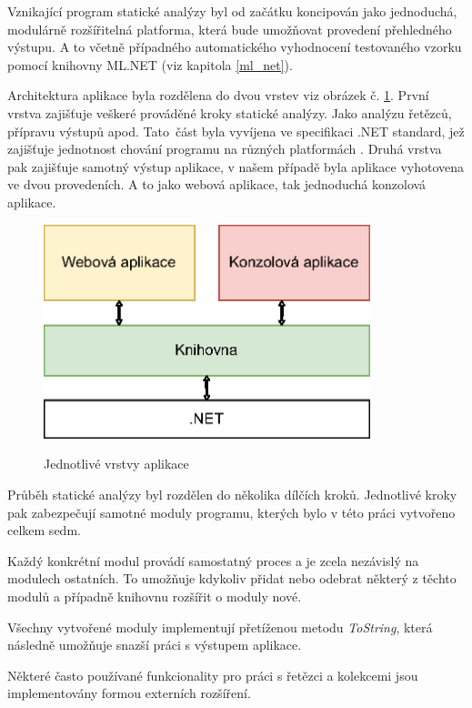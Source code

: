 Vznikající program statické analýzy byl od začátku koncipován jako jednoduchá, modulárně rozšířitelná platforma, která bude umožňovat provedení přehledného výstupu. A to včetně případného automatického vyhodnocení testovaného vzorku pomocí knihovny ML.NET (viz kapitola \ref{ml_net}).

Architektura aplikace byla rozdělena do dvou vrstev viz obrázek č. \ref{fig:appLayers}. První vrstva zajišťuje veškeré prováděné kroky statické analýzy. Jako analýzu řetězců, přípravu výstupů apod. Tato~část byla vyvíjena ve specifikaci .NET standard, jež zajišťuje jednotnost chování programu na různých platformách \cite{dotnet_standard}. \label{dotnet_standard}
Druhá vrstva pak zajišťuje samotný výstup aplikace, v našem případě byla aplikace vyhotovena ve dvou provedeních. A to jako webová aplikace, tak jednoduchá konzolová aplikace. 

\begin{figure}[H]
    \caption{Jednotlivé vrstvy aplikace}
    \centering
    \includegraphics[width=95mm,scale=0.5]{Figures/obrazky/Programlayers.eps}
    \label{fig:appLayers}
\end{figure}


Průběh statické analýzy byl rozdělen do několika dílčích kroků. Jednotlivé kroky pak zabezpečují samotné moduly programu, kterých bylo v této práci vytvořeno celkem sedm.

Každý konkrétní modul provádí samostatný proces a je zcela nezávislý na modulech ostatních. To umožňuje kdykoliv přidat nebo odebrat některý z těchto modulů a případně knihovnu rozšířit o moduly nové.

Všechny vytvořené moduly implementují přetíženou metodu \emph{ToString}, která následně umožňuje snazší práci s výstupem aplikace.

Některé často používané funkcionality pro práci s řetězci a kolekcemi jsou implementovány formou externích rozšíření.

